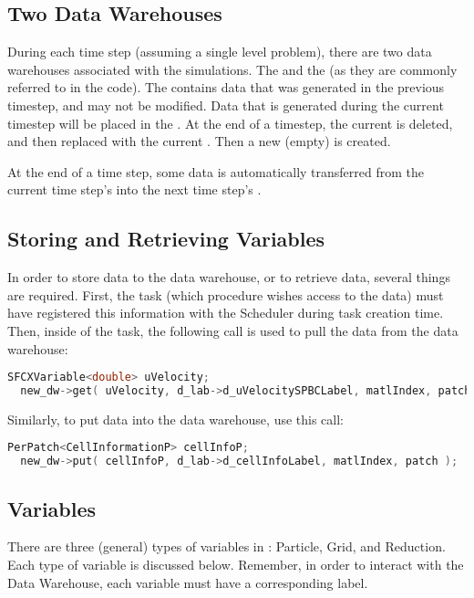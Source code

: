\subsection{Two Data Warehouses}
During each time step (assuming a single level problem), there are two data 
warehouses associated with the simulations. The  and the 
 (as they are commonly referred to in the code). The 
 contains data that was generated in the previous timestep, 
and may not be modified. Data that is generated during the current timestep will 
be placed in the . At the end of a timestep, the current 
 is deleted, and then replaced with the 
current . Then a new (empty)  is created.

At the end of a time step, some data is automatically transferred from the 
current time step's  into the next 
time step's . 

\subsection{Storing and Retrieving Variables}
In order to store data to the data warehouse, or to retrieve data, several 
things are required. First, the task (which procedure wishes access to the 
data) must have registered this information with the Scheduler during task 
creation time. Then, inside of the task, the following call is used to pull 
the data from the data warehouse: 

\begin{lstlisting}[language=Cpp]
  SFCXVariable<double> uVelocity;
  new_dw->get( uVelocity, d_lab->d_uVelocitySPBCLabel, matlIndex, patch, Ghost::AroundFaces, Arches::ONEGHOSTCELL ); 
\end{lstlisting}

Similarly, to put data into the data warehouse, use this call: 
\begin{lstlisting}[language=Cpp]
  PerPatch<CellInformationP> cellInfoP;
  new_dw->put( cellInfoP, d_lab->d_cellInfoLabel, matlIndex, patch ); 
\end{lstlisting}

\subsection{Variables}
There are three (general) types of variables in \Vaango: Particle, Grid, and Reduction. 
Each type of variable is discussed below. Remember, in order to interact with the 
Data Warehouse, each variable must have a corresponding label. 

